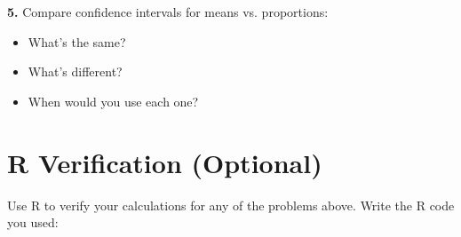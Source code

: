 \documentclass[11pt]{article}
\begin{document}
\textbf{5.} Compare confidence intervals for means vs. proportions:
\begin{itemize}
\item What's the same?
\item What's different?
\item When would you use each one?
\end{itemize}

\vspace{3cm}

\section*{R Verification (Optional)}

Use R to verify your calculations for any of the problems above. Write the R code you used:

\vspace{4cm}
\end{document}
